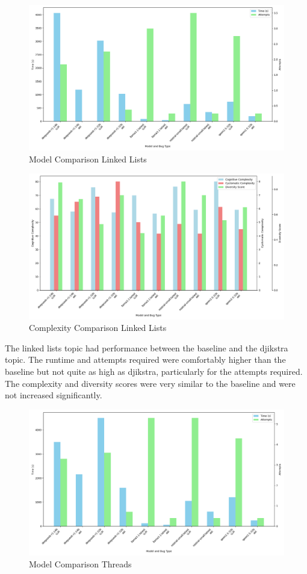 \documentclass[12pt]{extarticle}
\begin{document}
\begin{figure}[h!]
\centering
\includegraphics[width=0.8\linewidth]{Images/Model_Comparison_Linked_Lists.png}
\caption{Model Comparison Linked Lists}
\label{fig:Model_Comparison_Linked_Lists}
\end{figure}

\begin{figure}[h!]
\centering
\includegraphics[width=0.8\linewidth]{Images/Complexity_Comparison_Linked_Lists.png}
\caption{Complexity Comparison Linked Lists}
\label{fig:Complexity_Comparison_Linked_Lists}
\end{figure}

The linked lists topic had performance between the baseline and the djikstra topic. The runtime and attempts required were comfortably higher than the baseline but not quite as high as djikstra, particularly for the attempts required. The complexity and diversity scores were very similar to the baseline and were not increased significantly. 

\begin{figure}[h!]
\centering
\includegraphics[width=0.8\linewidth]{Images/Model_Comparison_Threads.png}
\caption{Model Comparison Threads}
\label{fig:Model_Comparison_Threads}
\end{figure}
\end{document}
